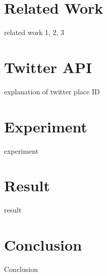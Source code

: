 \documentclass[twocolumn]{article}
\begin{document}
\vspace{-6mm}

\section{Related Work}
\vspace{-2mm}
related work 1, 2, 3
\vspace{-6mm}

\section{Twitter API}
\vspace{-2mm}
explanation of twitter place ID
\vspace{-6mm}

\section{Experiment}
\vspace{-2mm}
experiment
\vspace{-6mm}

\section{Result}
\vspace{-2mm}
result
\vspace{-6mm}

\section{Conclusion}
\vspace{-2mm}
Conclusion
\vspace{-6mm}


\end{document}
